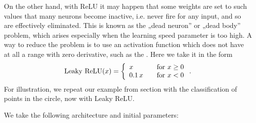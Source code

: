 \documentclass[a4paper,12pt,polish]{jupyterBook}
\begin{document}
\sphinxAtStartPar
On the other hand, with ReLU it may happen that some weights are set to such values that many neurons become inactive, i.e. never fire for any input, and so are effectively eliminated. This is known as the „dead neuron” or „dead body” problem, which arises especially when the learning speed parameter is too high. A way to reduce the problem is to use an activation function which does not have at all a range with zero derivative, such as the . Here we take it in the form
\begin{equation*}
\begin{split}
{\rm Leaky~ReLU}(x) = \left \{ \begin{array}{ll} x &{\rm ~~~ for~} x \ge 0 \\
                                          0.1 \, x &{\rm ~~~ for~} x < 0 \end{array}    \right . .
\end{split}
\end{equation*}
\sphinxAtStartPar
For illustration, we repeat our example from section {\hyperref[\detokenize{docs/backprop:circ-lab}]{}} with the classification of points in the circle, now with Leaky ReLU.

\sphinxAtStartPar
We take the following architecture and initial parameters:
\begin{sphinxVerbatimInput}

\begin{sphinxVerbatim}[commandchars=\\\{\}]
\PYG{p}{[}\PYG{p}{]}                   
  
                           
\end{sphinxVerbatim}
\end{sphinxVerbatimInput}
\end{document}

